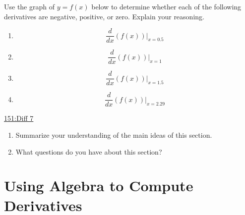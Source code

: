 \documentclass{ximera}
\begin{document}
\begin{exploration} \label{Expt666776665221}
Use the graph of $y=f(x)$ below to determine whether each of the following derivatives are negative, positive, or zero. Explain your reasoning.

\begin{enumerate}
\item 
\[
\frac{d}{dx}\left( f(x) \right)\Big|_{x=0.5}
\]

\item 
\[
\frac{d}{dx}\left( f(x) \right)\Big|_{x=1}
\]

\item 
\[
\frac{d}{dx}\left( f(x) \right)\Big|_{x=1.5}
\]

\item 
\[
\frac{d}{dx}\left( f(x) \right)\Big|_{x=2.29}
\]
\end{enumerate}

\begin{onlineOnly}
    \begin{center}
\end{center}
\end{onlineOnly}

\href{https://www.desmos.com/calculator/ks2yui6ofs}{151:Diff 7}


\end{exploration}




\begin{question}  \label{Q64566y565454}
\begin{enumerate}
\item Summarize your understanding of the main ideas of this section.

\item What questions do you have about this section?
\end{enumerate}
\begin{freeResponse}
\end{freeResponse}
\end{question}


\section{Using Algebra to Compute Derivatives}
\end{document}
